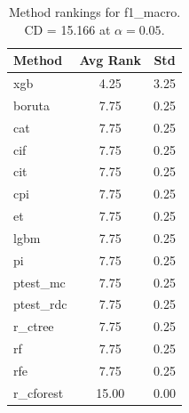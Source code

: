 \begin{table}[h]
\centering
\caption{Method rankings for f1_macro. CD = 15.166 at $\alpha=0.05$.}
\label{tab:ranks_f1_macro}
\begin{tabular}{lcc}
\toprule
Method & Avg Rank & Std \\
\midrule
xgb & 4.25 & 3.25 \\
boruta & 7.75 & 0.25 \\
cat & 7.75 & 0.25 \\
cif & 7.75 & 0.25 \\
cit & 7.75 & 0.25 \\
cpi & 7.75 & 0.25 \\
et & 7.75 & 0.25 \\
lgbm & 7.75 & 0.25 \\
pi & 7.75 & 0.25 \\
ptest_mc & 7.75 & 0.25 \\
ptest_rdc & 7.75 & 0.25 \\
r_ctree & 7.75 & 0.25 \\
rf & 7.75 & 0.25 \\
rfe & 7.75 & 0.25 \\
r_cforest & 15.00 & 0.00 \\
\bottomrule
\end{tabular}
\end{table}